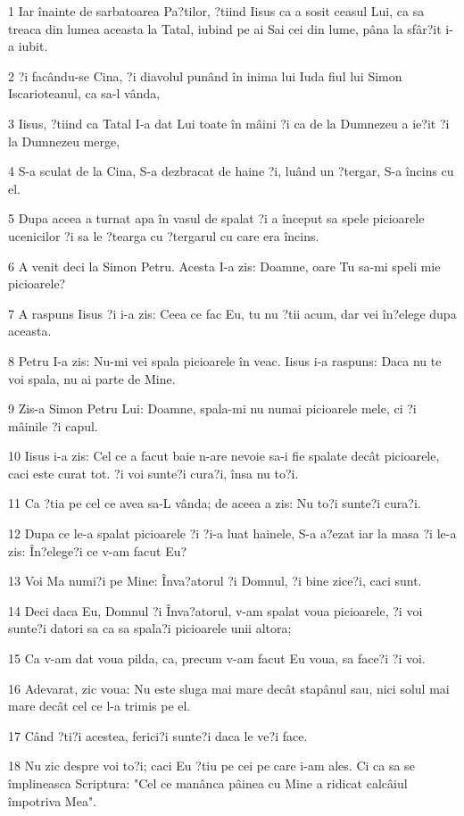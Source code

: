 \par 1 Iar înainte de sarbatoarea Pa?tilor, ?tiind Iisus ca a sosit ceasul Lui, ca sa treaca din lumea aceasta la Tatal, iubind pe ai Sai cei din lume, pâna la sfâr?it i-a iubit.
\par 2 ?i facându-se Cina, ?i diavolul punând în inima lui Iuda fiul lui Simon Iscarioteanul, ca sa-l vânda,
\par 3 Iisus, ?tiind ca Tatal I-a dat Lui toate în mâini ?i ca de la Dumnezeu a ie?it ?i la Dumnezeu merge,
\par 4 S-a sculat de la Cina, S-a dezbracat de haine ?i, luând un ?tergar, S-a încins cu el.
\par 5 Dupa aceea a turnat apa în vasul de spalat ?i a început sa spele picioarele ucenicilor ?i sa le ?tearga cu ?tergarul cu care era încins.
\par 6 A venit deci la Simon Petru. Acesta I-a zis: Doamne, oare Tu sa-mi speli mie picioarele?
\par 7 A raspuns Iisus ?i i-a zis: Ceea ce fac Eu, tu nu ?tii acum, dar vei în?elege dupa aceasta.
\par 8 Petru I-a zis: Nu-mi vei spala picioarele în veac. Iisus i-a raspuns: Daca nu te voi spala, nu ai parte de Mine.
\par 9 Zis-a Simon Petru Lui: Doamne, spala-mi nu numai picioarele mele, ci ?i mâinile ?i capul.
\par 10 Iisus i-a zis: Cel ce a facut baie n-are nevoie sa-i fie spalate decât picioarele, caci este curat tot. ?i voi sunte?i cura?i, însa nu to?i.
\par 11 Ca ?tia pe cel ce avea sa-L vânda; de aceea a zis: Nu to?i sunte?i cura?i.
\par 12 Dupa ce le-a spalat picioarele ?i ?i-a luat hainele, S-a a?ezat iar la masa ?i le-a zis: În?elege?i ce v-am facut Eu?
\par 13 Voi Ma numi?i pe Mine: Înva?atorul ?i Domnul, ?i bine zice?i, caci sunt.
\par 14 Deci daca Eu, Domnul ?i Înva?atorul, v-am spalat voua picioarele, ?i voi sunte?i datori sa ca sa spala?i picioarele unii altora;
\par 15 Ca v-am dat voua pilda, ca, precum v-am facut Eu voua, sa face?i ?i voi.
\par 16 Adevarat, zic voua: Nu este sluga mai mare decât stapânul sau, nici solul mai mare decât cel ce l-a trimis pe el.
\par 17 Când ?ti?i acestea, ferici?i sunte?i daca le ve?i face.
\par 18 Nu zic despre voi to?i; caci Eu ?tiu pe cei pe care i-am ales. Ci ca sa se împlineasca Scriptura: "Cel ce manânca pâinea cu Mine a ridicat calcâiul împotriva Mea".
